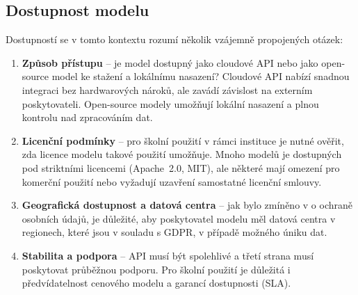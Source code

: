 \subsection{Dostupnost modelu}
\label{subsec:criteria-availability}

Dostupností se v tomto kontextu rozumí několik vzájemně propojených otázek:

\begin{enumerate}
    \item \textbf{Způsob přístupu} -- je model dostupný jako cloudové API nebo jako open-source model ke stažení a lokálnímu nasazení?
    Cloudové API nabízí snadnou integraci bez hardwarových nároků, ale zavádí závislost na externím poskytovateli.
    Open-source modely umožňují lokální nasazení a plnou kontrolu nad zpracováním dat.

    \item \textbf{Licenční podmínky} -- pro školní použití v rámci instituce je nutné ověřit, zda licence modelu takové použití umožňuje.
    Mnoho modelů je dostupných pod striktními licencemi (Apache~2.0, MIT), ale některé mají omezení pro komerční použití nebo vyžadují uzavření samostatné licenční smlouvy.

    \item \textbf{Geografická dostupnost a datová centra} -- jak bylo zmíněno v  o ochraně osobních údajů, je důležité, aby poskytovatel modelu měl datová centra v regionech, které jsou v souladu s GDPR, v případě možného úniku dat.

    \item \textbf{Stabilita a podpora} -- API musí být spolehlivé a třetí strana musí poskytovat průběžnou podporu.
    Pro školní použití je důležitá i předvídatelnost cenového modelu a garancí dostupnosti (SLA).
\end{enumerate}

\endinput